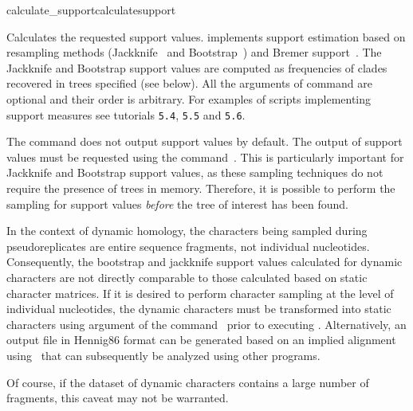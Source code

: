
\begin{command}{calculate\_support}{calculatesupport}


\begin{poydescription} 
Calculates the requested support values. \poy implements support
estimation based on resampling methods (Jackknife~\cite{Farrisetal1996}
and Bootstrap~\cite{Felsenstein1985}) and Bremer support~\cite{Bremer1988,
Kallersjoetal1992}. The Jackknife and Bootstrap support values are
computed as frequencies of clades recovered in trees specified (see below). 
All the arguments of 
command are optional and their order is arbitrary. For examples
of scripts implementing support measures see tutorials \texttt{5.4},
\texttt{5.5} and \texttt{5.6}.

The  command does not output support
values by default. The output of support values must be requested
using the command~. This is particularly important
for Jackknife and Bootstrap support values, as these sampling
techniques do not require the presence of trees in memory. Therefore,
it is possible to perform the sampling for support values \emph{before}
the tree of interest has been found. 
\end{poydescription}

\begin{statement}
In the context of dynamic homology, the characters being sampled
during pseudoreplicates are entire sequence fragments, not individual
nucleotides. Consequently, the bootstrap and jackknife support
values calculated for dynamic characters are not directly comparable
to those calculated based on static character matrices. If it is
desired to perform character sampling at the level of individual
nucleotides, the dynamic characters must be transformed into static
characters using  argument of the
command~ prior to executing
. Alternatively, an output file in
 Hennig86 format can be generated based on an implied alignment
using~ that can subsequently be analyzed using
other programs.

\setlength{\parindent}{0.5cm}                
\indent Of course, 
if the dataset of dynamic characters contains a large number of fragments, 
this caveat may not be warranted.


\end{statement}
\end{command}
